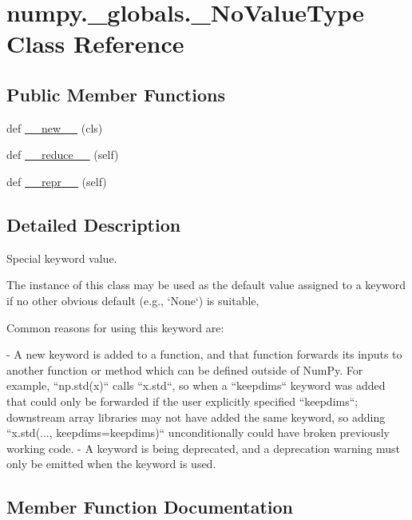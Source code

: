 \hypertarget{classnumpy_1_1__globals_1_1__NoValueType}{}\section{numpy.\+\_\+globals.\+\_\+\+No\+Value\+Type Class Reference}
\label{classnumpy_1_1__globals_1_1__NoValueType}
\subsection*{Public Member Functions}
\begin{DoxyCompactItemize}
\item 
def \hyperlink{classnumpy_1_1__globals_1_1__NoValueType_a1b702cac06a24028fe954db4773cfab0}{\+\_\+\+\_\+new\+\_\+\+\_\+} (cls)
\item 
def \hyperlink{classnumpy_1_1__globals_1_1__NoValueType_ae7c5fc91c1e34919da86e8136f9f0476}{\+\_\+\+\_\+reduce\+\_\+\+\_\+} (self)
\item 
def \hyperlink{classnumpy_1_1__globals_1_1__NoValueType_ad270193543610521dd6a48881f494918}{\+\_\+\+\_\+repr\+\_\+\+\_\+} (self)
\end{DoxyCompactItemize}


\subsection{Detailed Description}
\begin{DoxyVerb}Special keyword value.

The instance of this class may be used as the default value assigned to a
keyword if no other obvious default (e.g., `None`) is suitable,

Common reasons for using this keyword are:

- A new keyword is added to a function, and that function forwards its
  inputs to another function or method which can be defined outside of
  NumPy. For example, ``np.std(x)`` calls ``x.std``, so when a ``keepdims``
  keyword was added that could only be forwarded if the user explicitly
  specified ``keepdims``; downstream array libraries may not have added
  the same keyword, so adding ``x.std(..., keepdims=keepdims)``
  unconditionally could have broken previously working code.
- A keyword is being deprecated, and a deprecation warning must only be
  emitted when the keyword is used.\end{DoxyVerb}
 

\subsection{Member Function Documentation}
\mbox{\label{classnumpy_1_1__globals_1_1__NoValueType_a1b702cac06a24028fe954db4773cfab0}} 

